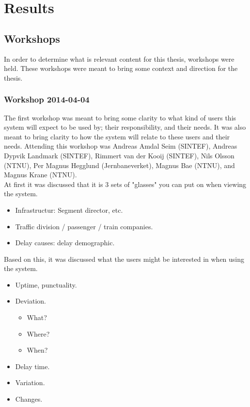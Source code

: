 

\chapter{Results}
\label{chapter:results}

\section{Workshops} %
\label{sec:workshops}
In order to determine what is relevant content for this thesis, workshops were
held. These workshops were meant to bring some context and direction for the
thesis. 

\subsection{Workshop 2014-04-04} %
\label{sub:workshop_2014_04_04}
The first workshop was meant to bring some clarity to what kind of users this
system will expect to be used by; their responsibility, and their needs.
It was also meant to bring clarity to how the system will relate to these users and their needs.
Attending this workshop was Andreas Amdal Seim (SINTEF), Andreas Dypvik 
Landmark (SINTEF), Rimmert van der Kooij (SINTEF), Nils Olsson (NTNU), Per 
Magnus Hegglund (Jernbaneverket), Magnus Bae (NTNU), and Magnus Krane (NTNU).\\

At first it was discussed that it is 3 sets of "glasses" you can put on when
viewing the system.
\begin{itemize}
	\item Infrastructur: Segment director, etc.
	\item Traffic division / passenger / train companies.
	\item Delay causes: delay demographic.
\end{itemize}

Based on this, it was discussed what the users might be interested in when
using the system.
\begin{itemize}
	\item Uptime, punctuality.
	\item Deviation.
	\begin{itemize}
		\item What?
		\item Where?
		\item When?
	\end{itemize}
	\item Delay time.
	\item Variation.
	\item Changes.
\end{itemize}

